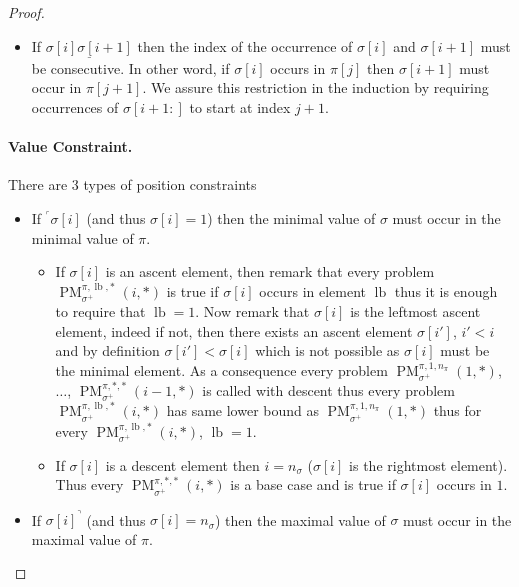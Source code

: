 \documentclass[a4paper]{llncs}
\newcommand{\ptext}{\pi}
\newcommand{\pmotif}{\sigma}
\newcommand{\pbmotif}{\pmotif^+}
\DeclareMathOperator{\PMa}{PM}
\newcommand{\PM}[6]{\PMa_{{#1}}^{{#2},{#3},{#4}}({#5},{#6})}
\DeclareMathOperator{\lb}{lb}
\begin{document}
\begin{proof}
\begin{itemize}
	\item If $\underline{\pmotif[i]\pmotif[i+1]}$ then the index of the occurrence of $\pmotif[i]$ and $\pmotif[i+1]$ must be consecutive. In other word, if $\pmotif[i]$ occurs in $\ptext[j]$ then $\pmotif[i+1]$ must occur in $\ptext[j+1]$. We assure this restriction in the induction by requiring occurrences of $\pmotif[i+1:]$ to start at index $j+1$.
\end{itemize}

\paragraph{Value Constraint.} There are 3 types of position constraints
\begin{itemize}
	\item If $^\ulcorner{\sigma[i]}$ (and thus $\sigma[i]=1$) then the minimal value of $\pmotif$ must occur in the minimal value of $\ptext$.
	\begin{itemize}

		\item If $\sigma[i]$ is an ascent element, then remark that 
		every problem 
		$\PM{\pbmotif}{\ptext}{\lb}{*}{i}{*}$ is true if $\sigma[i]$ occurs in element $\lb$ thus it is enough to require that $\lb=1$.
		Now remark that $\sigma[i]$ is the leftmost ascent element, indeed if not, then there exists an ascent element $\sigma[i']$, $i'<i$ and by definition $\sigma[i']<\sigma[i]$ which is not possible as $\sigma[i]$ must be the minimal element. As a consequence every problem $\PM{\pbmotif}{\ptext}{1}{n_{\pi}}{1}{*}$, $\dots$, $\PM{\pbmotif}{\ptext}{*}{*}{i-1}{*}$ is called with descent thus every problem 
		$\PM{\pbmotif}{\ptext}{\lb}{*}{i}{*}$ has same lower bound as $\PM{\pbmotif}{\ptext}{1}{n_{\ptext}}{1}{*}$ thus for every $\PM{\pbmotif}{\ptext}{\lb}{*}{i}{*}$, $\lb=1$.
					
		\item If $\sigma[i]$ is a descent element then $i=n_\pmotif$ ($\sigma[i]$ is the rightmost element). Thus every $\PM{\pbmotif}{\ptext}{*}{*}{i}{*}$ is a base case and is true if $\sigma[i]$ occurs in $1$.
	\end{itemize}

	\item If ${\pmotif[i]}^\urcorner$ (and thus $\sigma[i]=n_\pmotif$) then the maximal value of $\pmotif$ must occur in the maximal value of $\ptext$.
	\begin{itemize}


\end{itemize}
\end{itemize}
\end{proof}
\end{document}
